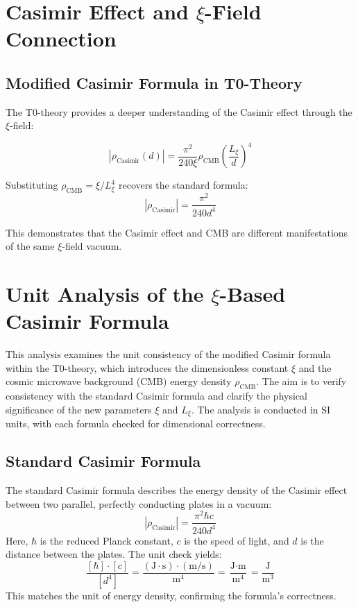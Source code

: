 	\section{Casimir Effect and $\xi$-Field Connection}
	
	\subsection{Modified Casimir Formula in T0-Theory}
	
	The T0-theory provides a deeper understanding of the Casimir effect through the $\xi$-field:
	
	\begin{equation}
		|\rho_{\text{Casimir}}(d)| = \frac{\pi^2}{240 \xi} \rho_{\text{CMB}} \left(\frac{L_\xi}{d}\right)^4
	\end{equation}
	
	Substituting $\rho_{\text{CMB}} = \xi/L_\xi^4$ recovers the standard formula:
	\begin{equation}
		|\rho_{\text{Casimir}}| = \frac{\pi^2}{240 d^4}
	\end{equation}
	
	This demonstrates that the Casimir effect and CMB are different manifestations of the same $\xi$-field vacuum.
	
	\section{Unit Analysis of the $\xi$-Based Casimir Formula}
	
	This analysis examines the unit consistency of the modified Casimir formula within the T0-theory, which introduces the dimensionless constant $\xi$ and the cosmic microwave background (CMB) energy density $\rho_{\text{CMB}}$. The aim is to verify consistency with the standard Casimir formula and clarify the physical significance of the new parameters $\xi$ and $L_\xi$. The analysis is conducted in SI units, with each formula checked for dimensional correctness.
	
	\subsection{Standard Casimir Formula}
	The standard Casimir formula describes the energy density of the Casimir effect between two parallel, perfectly conducting plates in a vacuum:
	\begin{equation}
		|\rho_{\text{Casimir}}| = \frac{\pi^2 \hbar c}{240 d^4}
	\end{equation}
	Here, $\hbar$ is the reduced Planck constant, $c$ is the speed of light, and $d$ is the distance between the plates. The unit check yields:
	\begin{equation}
		\frac{[\hbar] \cdot [c]}{[d^4]} = \frac{(\text{J} \cdot \text{s}) \cdot (\text{m}/\text{s})}{\text{m}^4} = \frac{\text{J} \cdot \text{m}}{\text{m}^4} = \frac{\text{J}}{\text{m}^3}
	\end{equation}
	This matches the unit of energy density, confirming the formula's correctness.
	
